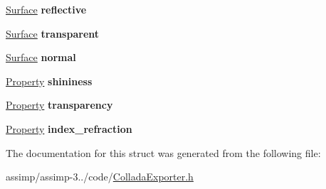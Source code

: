 \begin{DoxyCompactItemize}
\item 
\hypertarget{struct_assimp_1_1_collada_exporter_1_1_material_a4f5e27953b5d558053776d6f1498e8e3}{\hyperlink{struct_assimp_1_1_collada_exporter_1_1_surface}{Surface} {\bfseries reflective}}\label{struct_assimp_1_1_collada_exporter_1_1_material_a4f5e27953b5d558053776d6f1498e8e3}

\item 
\hypertarget{struct_assimp_1_1_collada_exporter_1_1_material_a8446439c2c7da17b749199aba9a72d33}{\hyperlink{struct_assimp_1_1_collada_exporter_1_1_surface}{Surface} {\bfseries transparent}}\label{struct_assimp_1_1_collada_exporter_1_1_material_a8446439c2c7da17b749199aba9a72d33}

\item 
\hypertarget{struct_assimp_1_1_collada_exporter_1_1_material_a53455b5a519907ee6299a7469f86c0d6}{\hyperlink{struct_assimp_1_1_collada_exporter_1_1_surface}{Surface} {\bfseries normal}}\label{struct_assimp_1_1_collada_exporter_1_1_material_a53455b5a519907ee6299a7469f86c0d6}

\item 
\hypertarget{struct_assimp_1_1_collada_exporter_1_1_material_a1bbba403aa21a21799059f092d2f7ab4}{\hyperlink{struct_assimp_1_1_collada_exporter_1_1_property}{Property} {\bfseries shininess}}\label{struct_assimp_1_1_collada_exporter_1_1_material_a1bbba403aa21a21799059f092d2f7ab4}

\item 
\hypertarget{struct_assimp_1_1_collada_exporter_1_1_material_a63e80b14b474e17d5bd6d4c7b6871bc2}{\hyperlink{struct_assimp_1_1_collada_exporter_1_1_property}{Property} {\bfseries transparency}}\label{struct_assimp_1_1_collada_exporter_1_1_material_a63e80b14b474e17d5bd6d4c7b6871bc2}

\item 
\hypertarget{struct_assimp_1_1_collada_exporter_1_1_material_a9ceeff76eb8ac9cd3cd131dbd0328247}{\hyperlink{struct_assimp_1_1_collada_exporter_1_1_property}{Property} {\bfseries index\+\_\+refraction}}\label{struct_assimp_1_1_collada_exporter_1_1_material_a9ceeff76eb8ac9cd3cd131dbd0328247}

\end{DoxyCompactItemize}


The documentation for this struct was generated from the following file\+:\begin{DoxyCompactItemize}
\item 
assimp/assimp-\/3../code/\hyperlink{_collada_exporter_8h}{Collada\+Exporter.\+h}\end{DoxyCompactItemize}
